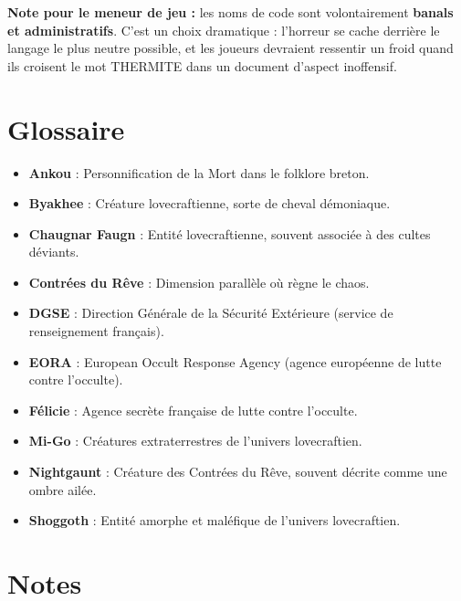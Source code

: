 \documentclass[10pt,a5paper,twoside]{book}
\begin{document}
\begin{shaded}
\textbf{Note pour le meneur de jeu :} les noms de code sont volontairement \textbf{banals et administratifs}. C'est un choix dramatique : l'horreur se cache derrière le langage le plus neutre possible, et les joueurs devraient ressentir un froid quand ils croisent le mot \og THERMITE \fg{} dans un document d'aspect inoffensif.
\end{shaded}

\clearpage


\section{Glossaire}
\begin{itemize}
	\item \textbf{Ankou} : Personnification de la Mort dans le folklore breton.
	\item \textbf{Byakhee} : Créature lovecraftienne, sorte de cheval démoniaque.
	\item \textbf{Chaugnar Faugn} : Entité lovecraftienne, souvent associée à des cultes déviants.
	\item \textbf{Contrées du Rêve} : Dimension parallèle où règne le chaos.
	\item \textbf{DGSE} : Direction Générale de la Sécurité Extérieure (service de renseignement français).
	\item \textbf{EORA} : European Occult Response Agency (agence européenne de lutte contre l'occulte).
	\item \textbf{Félicie} : Agence secrète française de lutte contre l'occulte.
	\item \textbf{Mi-Go} : Créatures extraterrestres de l'univers lovecraftien.
	\item \textbf{Nightgaunt} : Créature des Contrées du Rêve, souvent décrite comme une ombre ailée.
	\item \textbf{Shoggoth} : Entité amorphe et maléfique de l'univers lovecraftien.
\end{itemize}

\section{Notes}
\end{document}
